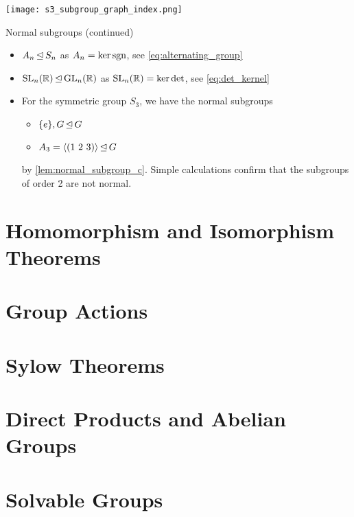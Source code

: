 \begin{marginfigure}
    \texttt{[image: s3\_subgroup\_graph\_index.png]}
    \caption{Subgroup graph of the symmetric group $S_3$. The index of the subgroups is shown in orange.}
\end{marginfigure}

\begin{ex}{Normal subgroups (continued)}{}
\begin{itemize}
    \item $A_n \operatorname*{\trianglelefteq} S_n$ as $A_n = \ker{\operatorname*{sgn}}$, see \cref{eq:alternating_group}
    \item $\mathrm{SL}_{n}(\mathbb{R}) \operatorname*{\trianglelefteq} \mathrm{GL}_{n}(\mathbb{R})$ as $\mathrm{SL}_{n}(\mathbb{R}) = \ker{\det}$, see \cref{eq:det_kernel}
    \item For the symmetric group $S_3$, we have the normal subgroups \begin{itemize}
        \item $\{e\}, G \operatorname*{\trianglelefteq} G$
        \item $A_3 = \langle (1\ 2\ 3) \rangle \operatorname*{\trianglelefteq} G$
    \end{itemize} by \cref{lem:normal_subgroup_c}. Simple calculations confirm that the subgroups of order 2 are not normal.
\end{itemize}
\end{ex}

\chapter{Homomorphism and Isomorphism Theorems}
\chapter{Group Actions}\label{sec:groups:actions}
\chapter{Sylow Theorems}
\chapter{Direct Products and Abelian Groups}
\chapter{Solvable Groups}
